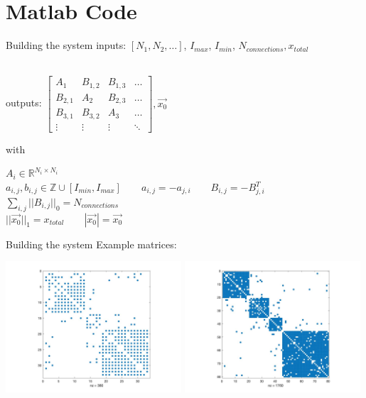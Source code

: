 \documentclass{beamer}
\begin{document}
\section{Matlab Code}
\begin{frame}{Building the system}
	inputs: $[N_1,N_2,\ldots]$, $I_{max}$, $I_{min}$, $N_{connections},x_{total}$
	
	~\\
	
	outputs: $\begin{bmatrix}
		A_1 & B_{1,2} & B_{1,3} & \ldots\\
		B_{2,1} & A_2 & B_{2,3} & \ldots\\
		B_{3,1} & B_{3,2} & A_3 & \ldots\\
		\vdots & \vdots & \vdots &\ddots
	\end{bmatrix},\vec{x_0}$	
	
	with
	
	$A_i\in\mathbb{R}^{N_i \times N_i}$ \\
	$a_{i,j}, b_{i,j} \in \mathbb{Z} \cup [I_{min},I_{max}] \quad \quad a_{i,j} = - a_{j,i}  \quad \quad B_{i,j}=-B_{j,i}^T$\\
	$\sum_{i,j} ||B_{i,j}||_0 = N_{connections}$ \\
	$||\vec{x_0}||_1=x_{total} \quad \quad |\vec{x_0}|=\vec{x_0}$
\end{frame}

\begin{frame}{Building the system}
	Example matrices: 
	
	\includegraphics[width=0.49\textwidth]{spy_1.jpg}
	\includegraphics[width=0.49\textwidth]{spy_2.jpg}
\end{frame}
\end{document}
